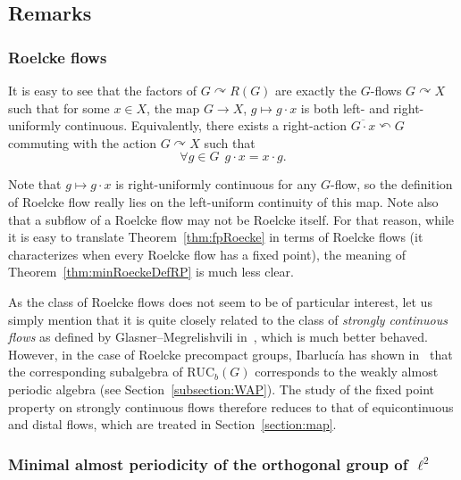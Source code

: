 \documentclass[11pt]{article}
\theoremstyle{definition}
\numberwithin{equation}{section}
\numberwithin{figure}{section}
\numberwithin{table}{section}
\newcommand{\actson}{\curvearrowright}
\newcommand{\RUCB}{\mathrm{RUC}_{b}}
\let\oldforall\forall
\renewcommand*{\forall}{\mathrel{\oldforall}}
\begin{document}
\subsection{Remarks}
\label{subsection:Remarks}

\subsubsection{Roelcke flows}

It is easy to see that the factors of $G\actson R(G)$ are exactly the $G$-flows $G\actson X$ such that for some $x\in X$, the map $G\rightarrow X$, $g\mapsto g\cdot x$ is both left- and right-uniformly continuous. Equivalently, there exists a right-action $\overline{G\cdot x}\curvearrowleft G$ commuting with the action $G\actson X$ such that
\[
\forall g\in G\ \ g\cdot x = x \cdot g.
\]

Note that $g\mapsto g\cdot x$ is right-uniformly continuous for any $G$-flow, so the definition of Roelcke flow really lies on the left-uniform continuity of this map. Note also that a subflow of a Roelcke flow may not be Roelcke itself. For that reason, while it is easy to translate Theorem~\ref{thm:fpRoecke} in terms of Roelcke flows (it characterizes when every Roelcke flow has a fixed point), the meaning of Theorem~\ref{thm:minRoeckeDefRP} is much less clear.

As the class of Roelcke flows does not seem to be of particular interest, let us simply mention that it is quite closely related to the class of \emph{strongly continuous flows} as defined by Glasner--Megrelishvili in~\cite{GlM2}, which is much better behaved. However, in the case of Roelcke precompact groups, Ibarluc\'ia has shown in~\cite{I1} that the corresponding subalgebra of $\RUCB(G)$ corresponds to the weakly almost periodic algebra (see Section~\ref{subsection:WAP}). The study of the fixed point property on strongly continuous flows therefore reduces to that of equicontinuous and distal flows, which are treated in Section~\ref{section:map}.


\subsubsection{Minimal almost periodicity of the orthogonal group of \texorpdfstring{$\ell^{2}$}{l2}}
\label{subsubsection:mapell2}
\end{document}
